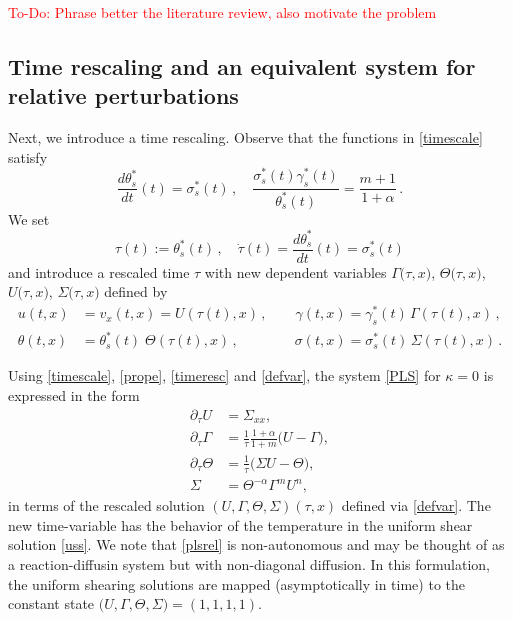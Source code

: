 \documentclass[a4paper,11pt]{article}
\newcommand{\tcr}{\textcolor{red}}
\theoremstyle{remark}
\begin{document}
\tcr{To-Do:  Phrase better the literature review, also motivate the problem}

\subsection{Time rescaling and an equivalent system for relative perturbations}
\label{sec:time}

Next, we introduce a time rescaling. Observe that the functions in \eqref{timescale} satisfy
\begin{equation}
\label{prope}
\frac{d \theta^*_s}{dt} (t) = \sigma^*_s (t)  \, , \quad \frac{\sigma^*_s (t) \gamma^*_s (t)}{\theta^*_s (t)} = \frac{m+1}{1+\alpha} \, .
\end{equation}
We set 
\begin{equation}
\label{timeresc}
\tau (t) := \theta^*_s(t) \, , \quad \dot \tau (t) = \frac{d \theta^*_s}{dt} (t) = \sigma^*_s (t)
\end{equation}
and introduce a rescaled time $\tau$ with new dependent variables 
$\Gamma\big(\tau,x\big)$, $\Theta\big(\tau,x\big)$, $U\big(\tau,x\big)$, $\Sigma\big(\tau,x\big)$ defined by 
\begin{equation}
\label{defvar}
 \begin{aligned}
 u (t, x) &= v_x (t, x) = U(\tau(t), x) \, , \qquad \gamma(t,x) = \gamma^*_s(t) \, \Gamma (\tau (t), x)\, ,
 \\
\theta(t,x) &= \theta^*_s (t)  \; \Theta (\tau(t), x) \, , \qquad \qquad \sigma(t,x) = \sigma^*_s (t) \, \Sigma (\tau (t) , x)\,.
\end{aligned}
\end{equation}


Using \eqref{timescale}, \eqref{prope}, \eqref{timeresc} and \eqref{defvar}, the system \eqref{PLS} for  $\kappa = 0$ is
expressed in the form
\begin{equation} \label{plsrel}
 \begin{aligned}
  \partial_\tau U &= \Sigma_{xx},\\
  \partial_\tau \Gamma &= \frac{1}{\tau}\frac{1+\alpha}{1+m} \Big(U-\Gamma\Big),\\
  \partial_\tau \Theta &= \frac{1}{\tau}\Big(\Sigma U - \Theta\Big), \\
  \Sigma&=\Theta^{-\alpha}\Gamma^m U^n,
 \end{aligned}
\end{equation}
in terms of the rescaled solution $(U, \Gamma, \Theta, \Sigma)(\tau, x)$ defined via \eqref{defvar}. The new time-variable has the
behavior of the temperature in the uniform shear solution \eqref{uss}.
We note that \eqref{plsrel} is non-autonomous and may be thought of as a reaction-diffusin system but with non-diagonal diffusion.
In this formulation, the uniform shearing solutions are mapped  (asymptotically in time) to the constant state 
$\big(U, \Gamma, \Theta,\Sigma \big)=(1,1,1,1)$. 
\end{document}
